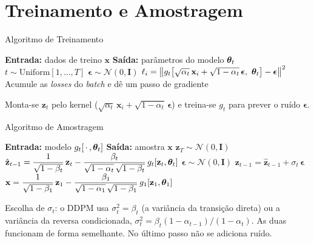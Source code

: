 \documentclass[aspectratio=169,xcolor=dvipsnames]{beamer}
\begin{document}
  \section{Treinamento e Amostragem}

  \begin{frame}{Algoritmo de Treinamento}
    \begin{algorithmic}
      \State \textbf{Entrada:} dados de treino $\mathbf{x}$
      \State \textbf{Saída:} parâmetros do modelo $\bm{\theta}_t$
      \Repeat
         
          \State $t \sim \mathrm{Uniform}[1,\ldots,T]$ 
          \State $\boldsymbol{\epsilon} \sim \mathcal{N}(0,\mathbf{I})$ 
          \State $\ell_i = \big\| g_t\big[\sqrt{\alpha_t}\,\mathbf{x}_i + \sqrt{1-\alpha_t}\,\boldsymbol{\epsilon},\ \bm{\theta}_t\big] - \boldsymbol{\epsilon} \big\|^{2}$
        \EndFor
        \State Acumule as \textit{losses} do \textit{batch} e dê um passo de gradiente
    \end{algorithmic}
    \vspace{0.8em}
    {\footnotesize Monta-se $\mathbf{z}_t$ pelo kernel ($\sqrt{\alpha_t}\,\mathbf{x}_i +
    \sqrt{1-\alpha_t}\,\boldsymbol{\epsilon}$) e treina-se $g_t$ para prever o ruído
    $\boldsymbol{\epsilon}$.}
  \end{frame}

  \begin{frame}{Algoritmo de Amostragem}
    \begin{algorithmic}
      \State \textbf{Entrada:} modelo $g_t[\,\cdot\,,\bm{\theta}_t]$
      \State \textbf{Saída:} amostra $\mathbf{x}$
      \State $\mathbf{z}_T \sim \mathcal{N}(0,\mathbf{I})$ 
        \State $\hat{\mathbf{z}}_{t-1} = \dfrac{1}{\sqrt{1-\beta_t}}\,\mathbf{z}_t -
          \dfrac{\beta_t}{\sqrt{1-\alpha_t}\,\sqrt{1-\beta_t}}\,g_t[\mathbf{z}_t,\bm{\theta}_t]$
        \State $\boldsymbol{\epsilon} \sim \mathcal{N}(0,\mathbf{I})$ 
        \State $\mathbf{z}_{t-1} = \hat{\mathbf{z}}_{t-1} + \sigma_t\,\boldsymbol{\epsilon}$ 
      \EndFor
      \State $\mathbf{x} = \dfrac{1}{\sqrt{1-\beta_1}}\,\mathbf{z}_1 -
        \dfrac{\beta_1}{\sqrt{1-\alpha_1}\,\sqrt{1-\beta_1}}\,g_1[\mathbf{z}_1,\bm{\theta}_1]$
    \end{algorithmic}
    \vspace{0.4em}
    {\footnotesize Escolha de $\sigma_t$: o DDPM usa $\sigma_t^{2} = \beta_t$
    (a variância da transição direta) ou a variância da reversa
    condicionada, $\sigma_t^{2} = \beta_t(1-\alpha_{t-1})/(1-\alpha_t)$. As
    duas funcionam de forma semelhante. No último passo não se adiciona
    ruído.}
  \end{frame}
\end{document}

